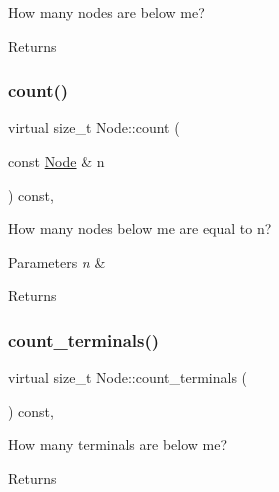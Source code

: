 How many nodes are below me? \begin{DoxyReturn}{Returns}

\end{DoxyReturn}
\mbox{\label{class_node_a0cc58478d98361566830a8d3db745718}} 
\subsubsection{\texorpdfstring{count()}{count()}\hspace{0.1cm}{\footnotesize\ttfamily [2/2]}}
{\footnotesize\ttfamily virtual size\+\_\+t Node\+::count (\begin{DoxyParamCaption}\item[{const \hyperlink{class_node}{Node} \&}]{n }\end{DoxyParamCaption}) const\hspace{0.3cm}{\ttfamily [inline]}, {\ttfamily [virtual]}}

How many nodes below me are equal to n? 
\begin{DoxyParams}{Parameters}
{\em n} & \\
\hline
\end{DoxyParams}
\begin{DoxyReturn}{Returns}

\end{DoxyReturn}
\mbox{\label{class_node_a70c820eaeaa852e3c0a46cf006026c1b}} 
\subsubsection{\texorpdfstring{count\+\_\+terminals()}{count\_terminals()}}
{\footnotesize\ttfamily virtual size\+\_\+t Node\+::count\+\_\+terminals (\begin{DoxyParamCaption}{ }\end{DoxyParamCaption}) const\hspace{0.3cm}{\ttfamily [inline]}, {\ttfamily [virtual]}}

How many terminals are below me? \begin{DoxyReturn}{Returns}

\end{DoxyReturn}
\mbox{\label{class_node_aea7c6e778d4720fb8071af71c57b1628}} 
